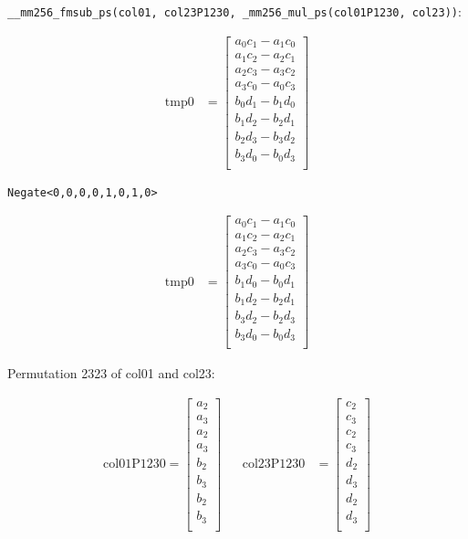 \documentclass[]{scrartcl}
\begin{document}
\texttt{__mm256_fmsub_ps(col01, col23P1230, _mm256_mul_ps(col01P1230, col23))}:

\begin{align*}
\mathrm{tmp0} 
&=
\begin{bmatrix}
a_0c_1 - a_1c_0\\
a_1c_2 - a_2c_1\\
a_2c_3 - a_3c_2\\
a_3c_0 - a_0c_3\\
b_0d_1 - b_1d_0\\
b_1d_2 - b_2d_1\\
b_2d_3 - b_3d_2\\
b_3d_0 - b_0d_3\\
\end{bmatrix}
\end{align*}

\texttt{Negate<0,0,0,0,1,0,1,0>} 

\begin{align*}
\mathrm{tmp0} 
&=
\begin{bmatrix}
a_0c_1 - a_1c_0\\
a_1c_2 - a_2c_1\\
a_2c_3 - a_3c_2\\
a_3c_0 - a_0c_3\\
b_1d_0 - b_0d_1\\
b_1d_2 - b_2d_1\\
b_3d_2 - b_2d_3\\
b_3d_0 - b_0d_3\\
\end{bmatrix}
\end{align*}



Permutation 2323 of col01 and col23:

\begin{align*}
\mathrm{col01P1230} 
=
\begin{bmatrix}
a_2\\
a_3\\
a_2\\
a_3\\
b_2\\
b_3\\
b_2\\
b_3\\
\end{bmatrix}
&&
\mathrm{col23P1230} 
&=
\begin{bmatrix}
c_2\\
c_3\\
c_2\\
c_3\\
d_2\\
d_3\\
d_2\\
d_3\\
\end{bmatrix}
\end{align*}
\end{document}
